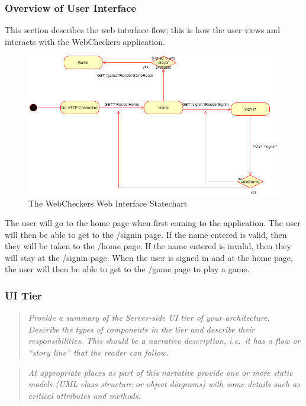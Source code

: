 \hypertarget{overview-of-user-interface}{%
\subsubsection{Overview of User
Interface}\label{overview-of-user-interface}}

This section describes the web interface flow; this is how the user
views and interacts with the WebCheckers application.

\begin{figure}
\centering
\includegraphics{web-interface.png}
\caption{The WebCheckers Web Interface Statechart}
\end{figure}

The user will go to the home page when first coming to the application.
The user will then be able to get to the /signin page. If the name
entered is valid, then they will be taken to the /home page. If the name
entered is invalid, then they will stay at the /signin page. When the
user is signed in and at the home page, the user will then be able to
get to the /game page to play a game.

\hypertarget{ui-tier}{%
\subsubsection{UI Tier}\label{ui-tier}}

\begin{quote}
\emph{Provide a summary of the Server-side UI tier of your architecture.
Describe the types of components in the tier and describe their
responsibilities. This should be a narrative description, i.e.~it has a
flow or ``story line'' that the reader can follow.}
\end{quote}

\begin{quote}
\emph{At appropriate places as part of this narrative provide one or
more static models (UML class structure or object diagrams) with some
details such as critical attributes and methods.}
\end{quote}


